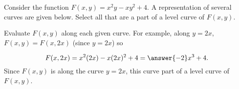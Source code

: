 \documentclass{ximera}
\author{Jim Talamo}
\begin{document}
\begin{exercise}
 
Consider the function $F(x,y) = x^2y-xy^2+4$.  A representation of several curves are given below.  Select all that are a part of a level curve of $F(x,y)$.

\begin{selectAll}
\end{selectAll}  

\begin{hint}
Evaluate $F(x,y)$ along each given curve.  For example, along $y=2x$, $F(x,y)=F(x,2x)$ (since $y=2x$) so

\[
F(x,2x) = x^2(2x)-x(2x)^2+4 = \answer{-2}x^3+4.
\]
Since $F(x,y)$ is  along the curve $y=2x$, this curve  part of a level curve of $F(x,y)$. 
\end{hint}
\end{exercise}
\end{document}
